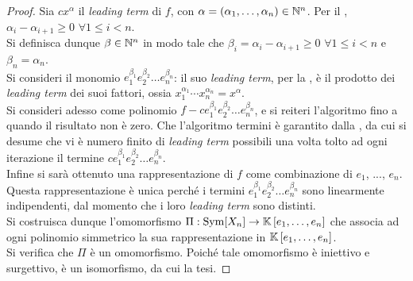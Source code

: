 \documentclass[11pt]{scrbook}
\begin{document}
\begin{proof}
    Sia $c x^\alpha$ il \textit{leading term} di $f$, con
    $\alpha = (\alpha_1, \ldots, \alpha_n) \in \mathbb N^n$.
    Per il ,
    $\alpha_i - \alpha_{i+1} \geq 0$ $\forall 1 \leq i < n$. \\
    
    Si definisca dunque $\beta \in \mathbb N^n$ in modo tale
    che $\beta_i = \alpha_i - \alpha_{i+1} \geq 0$ $\forall 1 \leq i < n$
    e $\beta_n = \alpha_n$. \\
    
    Si consideri il monomio $e_1^{\beta_1} e_2^{\beta_2} \ldots e_n^{\beta_n}$:
    il suo \textit{leading term}, per la ,
    è il prodotto dei \textit{leading term} dei suoi fattori,
    ossia $x_1^{\alpha_1} \cdots x_n^{\alpha_n} = x^\alpha$. \\
    
    Si consideri adesso come polinomio $f - c e_1^{\beta_1} e_2^{\beta_2} \ldots e_n^{\beta_n}$,
    e si reiteri l'algoritmo fino a quando il risultato non è zero. Che l'algoritmo
    termini è garantito dalla , da cui
    si desume che vi è numero finito di \textit{leading term} possibili una
    volta tolto ad ogni iterazione il termine $c e_1^{\beta_1} e_2^{\beta_2} \ldots e_n^{\beta_n}$. \\
    
    Infine si sarà ottenuto una rappresentazione di $f$ come combinazione di
    $e_1$, ..., $e_n$. Questa rappresentazione è unica perché
    i termini $e_1^{\beta_1} e_2^{\beta_2} \ldots e_n^{\beta_n}$ sono
    linearmente indipendenti, dal momento che i loro
    \textit{leading term} sono distinti. \\
    
    Si costruisca dunque l'omomorfismo $\Pi : \operatorname{Sym}[X_n] \to \mathbb{K}\left[e_1, \ldots, e_n\right]$
    che associa ad ogni polinomio simmetrico la sua rappresentazione in
    $\mathbb{K}\left[e_1, \ldots, e_n\right]$. \\
    
    Si verifica che $\Pi$ è un omomorfismo. Poiché tale omomorfismo è iniettivo
    e surgettivo, è un isomorfismo, da cui la tesi.
\end{proof}
\end{document}

